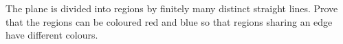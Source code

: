 The plane is divided into regions by finitely many distinct straight lines. Prove that the regions can be coloured red and blue so that regions sharing an edge have different colours.
